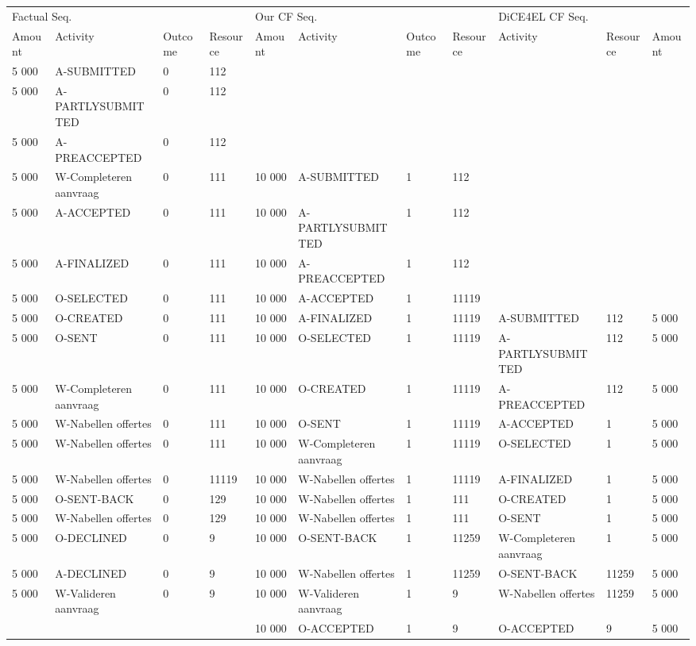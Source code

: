 \begin{tabular}{lllllllllll}
\toprule
\multicolumn{4}{l}{Factual Seq.} & \multicolumn{4}{l}{Our CF Seq.} & \multicolumn{3}{l}{DiCE4EL CF Seq.} \\
Amount & Activity & Outcome & Resource & Amount & Activity & Outcome & Resource & Activity & Resource & Amount \\
\midrule
5 000 & A-SUBMITTED & 0 & 112 &  &  &  &  &  &  &  \\
5 000 & A-PARTLYSUBMITTED & 0 & 112 &  &  &  &  &  &  &  \\
5 000 & A-PREACCEPTED & 0 & 112 &  &  &  &  &  &  &  \\
5 000 & W-Completeren aanvraag & 0 & 111 & 10 000 & A-SUBMITTED & 1 & 112 &  &  &  \\
5 000 & A-ACCEPTED & 0 & 111 & 10 000 & A-PARTLYSUBMITTED & 1 & 112 &  &  &  \\
5 000 & A-FINALIZED & 0 & 111 & 10 000 & A-PREACCEPTED & 1 & 112 &  &  &  \\
5 000 & O-SELECTED & 0 & 111 & 10 000 & A-ACCEPTED & 1 & 11119 &  &  &  \\
5 000 & O-CREATED & 0 & 111 & 10 000 & A-FINALIZED & 1 & 11119 & A-SUBMITTED & 112 & 5 000 \\
5 000 & O-SENT & 0 & 111 & 10 000 & O-SELECTED & 1 & 11119 & A-PARTLYSUBMITTED & 112 & 5 000 \\
5 000 & W-Completeren aanvraag & 0 & 111 & 10 000 & O-CREATED & 1 & 11119 & A-PREACCEPTED & 112 & 5 000 \\
5 000 & W-Nabellen offertes & 0 & 111 & 10 000 & O-SENT & 1 & 11119 & A-ACCEPTED & 1 & 5 000 \\
5 000 & W-Nabellen offertes & 0 & 111 & 10 000 & W-Completeren aanvraag & 1 & 11119 & O-SELECTED & 1 & 5 000 \\
5 000 & W-Nabellen offertes & 0 & 11119 & 10 000 & W-Nabellen offertes & 1 & 11119 & A-FINALIZED & 1 & 5 000 \\
5 000 & O-SENT-BACK & 0 & 129 & 10 000 & W-Nabellen offertes & 1 & 111 & O-CREATED & 1 & 5 000 \\
5 000 & W-Nabellen offertes & 0 & 129 & 10 000 & W-Nabellen offertes & 1 & 111 & O-SENT & 1 & 5 000 \\
5 000 & O-DECLINED & 0 & 9 & 10 000 & O-SENT-BACK & 1 & 11259 & W-Completeren aanvraag & 1 & 5 000 \\
5 000 & A-DECLINED & 0 & 9 & 10 000 & W-Nabellen offertes & 1 & 11259 & O-SENT-BACK & 11259 & 5 000 \\
5 000 & W-Valideren aanvraag & 0 & 9 & 10 000 & W-Valideren aanvraag & 1 & 9 & W-Nabellen offertes & 11259 & 5 000 \\
 &  &  &  & 10 000 & O-ACCEPTED & 1 & 9 & O-ACCEPTED & 9 & 5 000 \\
\bottomrule
\end{tabular}
